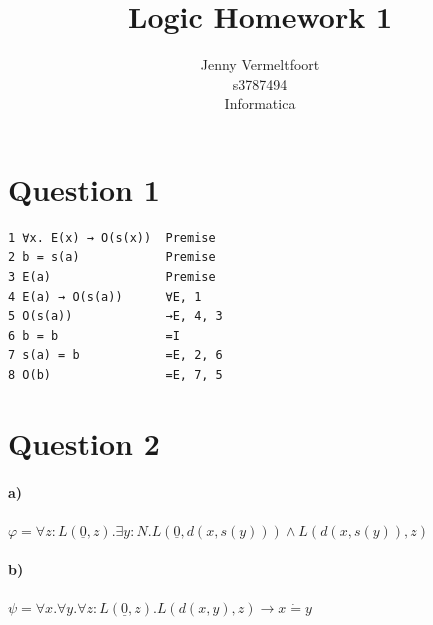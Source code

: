 \documentclass{article}
\title{Logic Homework 1}
\author{Jenny Vermeltfoort\\
  s3787494\\
  Informatica%
}
\begin{document}
\renewcommand*{\phi}{\varphi}
\renewcommand*{\epsilon}{\varepsilon}

\maketitle

\section*{Question 1}
\begin{verbatim}
1 ∀x. E(x) → O(s(x))  Premise
2 b = s(a)            Premise
3 E(a)                Premise
4 E(a) → O(s(a))      ∀E, 1
5 O(s(a))             →E, 4, 3
6 b = b               =I
7 s(a) = b            =E, 2, 6
8 O(b)                =E, 7, 5
\end{verbatim}

\newcommand\myeq{\mathrel{\stackrel{\makebox[0pt]{\mbox{\normalfont\tiny def}}}{=}}}

\section*{Question 2}
\paragraph{a)}
$ \phi  = \forall z : L(\underline{0}, z). \exists y : N. L(\underline{0}, d(x, s(y)))  \land L(d(x, s(y)), z) $

\paragraph{b)}
$ \psi =   \forall x. \forall y. \forall z: L(\underline{0}, z). L(d(x,y), z) \rightarrow x \dot{=} y$
\end{document}
